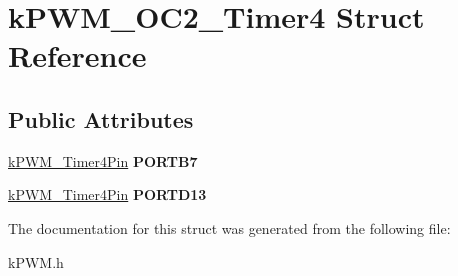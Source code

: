 \hypertarget{structkPWM__OC2__Timer4}{}\section{k\+P\+W\+M\+\_\+\+O\+C2\+\_\+\+Timer4 Struct Reference}
\label{structkPWM__OC2__Timer4}
\subsection*{Public Attributes}
\begin{DoxyCompactItemize}
\item 
\hyperlink{structkPWM__Timer4Pin}{k\+P\+W\+M\+\_\+\+Timer4\+Pin} {\bfseries P\+O\+R\+T\+B7}\hypertarget{structkPWM__OC2__Timer4_a776f178091d16ec27788c4dbe95b7762}{}\label{structkPWM__OC2__Timer4_a776f178091d16ec27788c4dbe95b7762}

\item 
\hyperlink{structkPWM__Timer4Pin}{k\+P\+W\+M\+\_\+\+Timer4\+Pin} {\bfseries P\+O\+R\+T\+D13}\hypertarget{structkPWM__OC2__Timer4_a31a68cfd9a8d73ed800f45a24f17e3ec}{}\label{structkPWM__OC2__Timer4_a31a68cfd9a8d73ed800f45a24f17e3ec}

\end{DoxyCompactItemize}


The documentation for this struct was generated from the following file\+:\begin{DoxyCompactItemize}
\item 
k\+P\+W\+M.\+h\end{DoxyCompactItemize}
